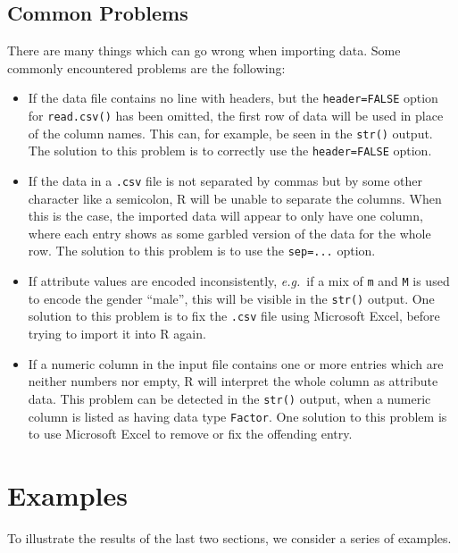 \documentclass[
  a4paper,
]{article}
\theoremstyle{definition}
\theoremstyle{definition}
\theoremstyle{definition}
\theoremstyle{definition}
\theoremstyle{remark}
\begin{document}
\subsection*{Common Problems}\label{common-problems}

There are many things which can go wrong when importing data. Some commonly
encountered problems are the following:

\begin{itemize}
\item
  If the data file contains no line with headers, but the
  \texttt{header=FALSE} option for \texttt{read.csv()} has been omitted,
  the first row of data will be used in place of the column names.
  This can, for example, be seen in the \texttt{str()} output. The
  solution to this problem is to correctly use the
  \texttt{header=FALSE} option.
\item
  If the data in a \texttt{.csv} file is not separated by commas but
  by some other character like a semicolon, R will be unable to
  separate the columns. When this is the case, the imported data will
  appear to only have one column, where each entry shows as some
  garbled version of the data for the whole row. The solution to this
  problem is to use the \texttt{sep=...} option.
\item
  If attribute values are encoded inconsistently, \emph{e.g.}~if
  a mix of \texttt{m} and \texttt{M} is used to encode the gender
  ``male'', this will be visible in the \texttt{str()} output. One
  solution to this problem is to fix the \texttt{.csv} file using
  Microsoft Excel, before trying to import it into R again.
\item
  If a numeric column in the input file contains one or more
  entries which are neither numbers nor empty, R will interpret the
  whole column as attribute data. This problem can be detected in the
  \texttt{str()} output, when a numeric column is listed as having data
  type \texttt{Factor}. One solution to this problem is to use
  Microsoft Excel to remove or fix the offending entry.
\end{itemize}

\clearpage

\section{Examples}\label{S07-examples}

To illustrate the results of the last two sections, we consider a series
of examples.
\end{document}
